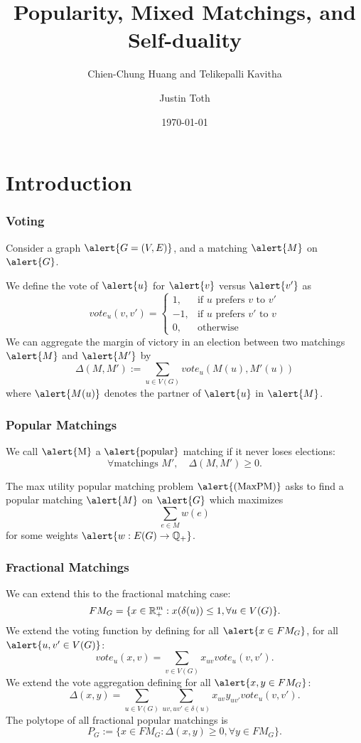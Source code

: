 \documentclass[10pt]{beamer}
\title{Popularity, Mixed Matchings, and Self-duality}
\subtitle{Chien-Chung Huang and Telikepalli Kavitha}
\date{\today}
\author{Justin Toth}
\institute{University of Waterloo}
\newcommand{\Q}{\mathbb{Q}}
\begin{document}
\maketitle

\section{Introduction}

\begin{frame}
\frametitle{Voting}
Consider a graph $\alert{G = (V,E)}$, and a matching $\alert{M}$ on $\alert{G}$.

We define the vote of $\alert{u}$ for $\alert{v}$ versus $\alert{v'}$ as
$$vote_u(v,v') = \begin{cases}
1, &\text{if $u$ prefers $v$ to $v'$} \\
-1, &\text{if $u$ prefers $v'$ to $v$} \\
0, &\text{otherwise}
\end{cases}
$$
We can aggregate the margin of victory in an election between two matchings $\alert{M}$ and $\alert{M'}$ by
$$\Delta(M,M') := \sum_{u \in V(G)} vote_u(M(u), M'(u)) $$
where $\alert{M(u)}$ denotes the partner of $\alert{u}$ in $\alert{M}$.
\end{frame}

\begin{frame}
\frametitle{Popular Matchings}
We call $\text{\alert{M}}$ a $\text{\alert{popular}}$ matching if it never loses elections:
$$\forall \text{matchings } M', \quad \Delta(M,M') \geq 0.$$


The max utility popular matching problem $\alert{\text{(MaxPM)}}$ asks to find a popular matching $\alert{M}$ on $\alert{G}$ which maximizes
$$\sum_{e\in M} w(e)$$
for some weights $\alert{ w: E(G) \rightarrow \Q_+}$.
\end{frame}

\begin{frame}
\frametitle{Fractional Matchings}
We can extend this to the fractional matching case:
$$FM_{G} = \{x \in \mathbb{R}^m_+ : x(\delta(u)) \leq 1, \forall u \in V(G)\}.$$
We extend the voting function by defining for all $\alert{x \in FM_G}$, for all $\alert{u,v' \in V(G)}$:
$$vote_u(x,v) = \sum_{v\in V(G)} x_{uv} vote_u(v,v').$$ 
We extend the vote aggregation defining for all $\alert{x, y \in FM_{G}}$:
$$\Delta(x,y) = \sum_{u \in V(G)} \sum_{uv, uv' \in \delta(u)} x_{uv}y_{uv'} vote_u(v,v').$$
The polytope of all fractional popular matchings is 
$$P_G := \{x \in FM_{G}: \Delta(x,y) \geq 0, \forall y \in FM_G\}.$$
\end{frame}
\end{document}

